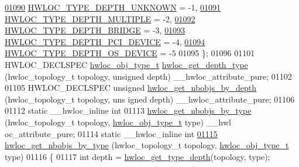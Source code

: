 \begin{DoxyCode}
\hypertarget{a00033_source_l01090}{}\hyperlink{a00046_ggaf4e663cf42bbe20756b849c6293ef575a0565ab92ab72cb0cec91e23003294aad}{01090}     \hyperlink{a00046_ggaf4e663cf42bbe20756b849c6293ef575a0565ab92ab72cb0cec91e23003294aad}{HWLOC_TYPE_DEPTH_UNKNOWN} = -1,    
\hypertarget{a00033_source_l01091}{}\hyperlink{a00046_ggaf4e663cf42bbe20756b849c6293ef575ae99465995cacde6c210d5fc2e409798c}{01091}     \hyperlink{a00046_ggaf4e663cf42bbe20756b849c6293ef575ae99465995cacde6c210d5fc2e409798c}{HWLOC_TYPE_DEPTH_MULTIPLE} = -2,   
\hypertarget{a00033_source_l01092}{}\hyperlink{a00046_ggaf4e663cf42bbe20756b849c6293ef575af93b50182973e4a718d9d4db9e253a90}{01092}     \hyperlink{a00046_ggaf4e663cf42bbe20756b849c6293ef575af93b50182973e4a718d9d4db9e253a90}{HWLOC_TYPE_DEPTH_BRIDGE} = -3,     
\hypertarget{a00033_source_l01093}{}\hyperlink{a00046_ggaf4e663cf42bbe20756b849c6293ef575ad8b1516e699b57ce1c8d107fbd2f674c}{01093}     \hyperlink{a00046_ggaf4e663cf42bbe20756b849c6293ef575ad8b1516e699b57ce1c8d107fbd2f674c}{HWLOC_TYPE_DEPTH_PCI_DEVICE} = -4, 
\hypertarget{a00033_source_l01094}{}\hyperlink{a00046_ggaf4e663cf42bbe20756b849c6293ef575afe9a2131073eebbe129d4aa2928d3f46}{01094}     \hyperlink{a00046_ggaf4e663cf42bbe20756b849c6293ef575afe9a2131073eebbe129d4aa2928d3f46}{HWLOC_TYPE_DEPTH_OS_DEVICE} = -5   
01095 \};
01096 
01101 HWLOC\_DECLSPEC \hyperlink{a00041_gacd37bb612667dc437d66bfb175a8dc55}{hwloc_obj_type_t} \hyperlink{a00046_gadd4964764ae7e49231065d58a553fd31}{hwloc_get_depth_type} (hwloc\_topology\_t topology, 
      \textcolor{keywordtype}{unsigned} depth) \_\_hwloc\_attribute\_pure;
01102 
01105 HWLOC\_DECLSPEC \textcolor{keywordtype}{unsigned} \hyperlink{a00046_ga20cfe2456f4cfdd789c9aca6d2fdd69f}{hwloc_get_nbobjs_by_depth} (hwloc\_topology\_t topology, \textcolor{keywordtype}{uns
      igned} depth) \_\_hwloc\_attribute\_pure;
01106 
01112 \textcolor{keyword}{static} \_\_hwloc\_inline \textcolor{keywordtype}{int}
01113 \hyperlink{a00046_gaba821f84ef64282d14577066e6d6547e}{hwloc_get_nbobjs_by_type} (hwloc\_topology\_t topology, \hyperlink{a00041_gacd37bb612667dc437d66bfb175a8dc55}{hwloc_obj_type_t} type) \_\_hwl
      oc\_attribute\_pure;
01114 \textcolor{keyword}{static} \_\_hwloc\_inline \textcolor{keywordtype}{int}
\hypertarget{a00033_source_l01115}{}\hyperlink{a00046_gaba821f84ef64282d14577066e6d6547e}{01115} \hyperlink{a00046_gaba821f84ef64282d14577066e6d6547e}{hwloc_get_nbobjs_by_type} (hwloc\_topology\_t topology, \hyperlink{a00041_gacd37bb612667dc437d66bfb175a8dc55}{hwloc_obj_type_t} type)
01116 \{
01117         \textcolor{keywordtype}{int} depth = \hyperlink{a00046_gaea7c64dd59467f5201ba87712710b14d}{hwloc_get_type_depth}(topology, type);

\end{DoxyCode}
